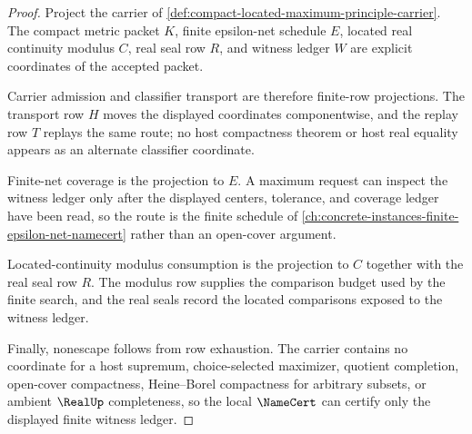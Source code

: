 \begin{proof}
Project the carrier of \autoref{def:compact-located-maximum-principle-carrier}. The compact metric packet $K$, finite epsilon-net schedule $E$, located real continuity modulus $C$, real seal row $R$, and witness ledger $W$ are explicit coordinates of the accepted packet.

Carrier admission and classifier transport are therefore finite-row projections. The transport row $H$ moves the displayed coordinates componentwise, and the replay row $T$ replays the same route; no host compactness theorem or host real equality appears as an alternate classifier coordinate.

Finite-net coverage is the projection to $E$. A maximum request can inspect the witness ledger only after the displayed centers, tolerance, and coverage ledger have been read, so the route is the finite schedule of \autoref{ch:concrete-instances-finite-epsilon-net-namecert} rather than an open-cover argument.

Located-continuity modulus consumption is the projection to $C$ together with the real seal row $R$. The modulus row supplies the comparison budget used by the finite search, and the real seals record the located comparisons exposed to the witness ledger.

Finally, nonescape follows from row exhaustion. The carrier contains no coordinate for a host supremum, choice-selected maximizer, quotient completion, open-cover compactness, Heine--Borel compactness for arbitrary subsets, or ambient $\RealUp$ completeness, so the local $\NameCert$ can certify only the displayed finite witness ledger.
\end{proof}



